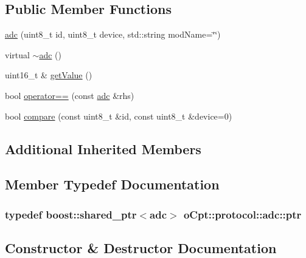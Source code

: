 \subsection*{Public Member Functions}
\begin{DoxyCompactItemize}
\item 
\hyperlink{classo_cpt_1_1protocol_1_1adc_aec27fd40080992220a7b641adcdfe9f9}{adc} (uint8\+\_\+t id, uint8\+\_\+t device, std\+::string mod\+Name=\char`\"{}\char`\"{})
\item 
virtual \hyperlink{classo_cpt_1_1protocol_1_1adc_ae61f97f81f6d76d5fc5fd783f49464ee}{$\sim$adc} ()
\item 
uint16\+\_\+t \& \hyperlink{classo_cpt_1_1protocol_1_1adc_a78a1abf9c5d72b7da8efea1be21e0a85}{get\+Value} ()
\item 
bool \hyperlink{classo_cpt_1_1protocol_1_1adc_afd7e7e1ab0855f53227a4fbf91449687}{operator==} (const \hyperlink{classo_cpt_1_1protocol_1_1adc}{adc} \&rhs)
\item 
bool \hyperlink{classo_cpt_1_1protocol_1_1adc_ae5ff90755d50ef617e9c00d704a88f52}{compare} (const uint8\+\_\+t \&id, const uint8\+\_\+t \&device=0)
\end{DoxyCompactItemize}
\subsection*{Additional Inherited Members}


\subsection{Member Typedef Documentation}
\subsubsection[{\texorpdfstring{ptr}{ptr}}]{\setlength{\rightskip}{0pt plus 5cm}typedef boost\+::shared\+\_\+ptr$<${\bf adc}$>$ {\bf o\+Cpt\+::protocol\+::adc\+::ptr}}\hypertarget{classo_cpt_1_1protocol_1_1adc_a94af68cb9c573629a4a1a16f8ebd3dff}{}\label{classo_cpt_1_1protocol_1_1adc_a94af68cb9c573629a4a1a16f8ebd3dff}


\subsection{Constructor \& Destructor Documentation}
